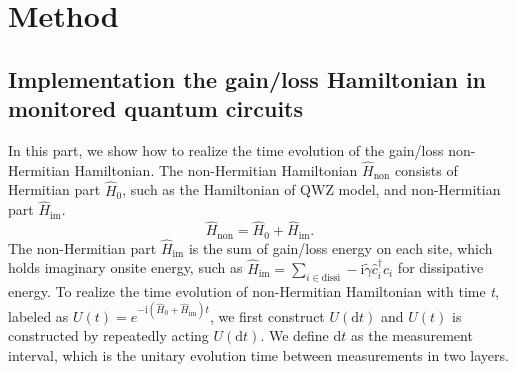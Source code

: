 \documentclass[longbibliography, aps, prx, amsmath, amssymb, amsfonts, twocolumn,superscriptaddress, footinbib]{revtex4-1}
\begin{document}


	\section{Method~\label{sec:method}}
	\subsection{Implementation the gain/loss Hamiltonian in monitored quantum circuits}

	In this part, we show how to realize the time evolution of the gain/loss non-Hermitian Hamiltonian. The non-Hermitian Hamiltonian $\hat{H}_{\text{non}}$ consists of Hermitian part $\hat{H}_0$, such as the Hamiltonian of QWZ model, and non-Hermitian part $\hat{H}_{\text{im}}$.
	\begin{equation}
		\hat{H}_{\text{non}} = \hat{H}_0 +\hat{H}_{\text{im}}. \label{eq:non-hermitian}
	\end{equation}
	The non-Hermitian part $\hat{H}_{\text{im}}$ is the sum of gain/loss energy on each site, which holds imaginary onsite energy, such as $\hat{H}_{\text{im}} = \sum_{i\in \text{dissi}} -\mathrm{i}\tilde{\gamma} \hat{c}_i^{\dagger} \hat{c}_i$ for dissipative energy. 
	To realize the time evolution of non-Hermitian Hamiltonian with time \textit{t}, labeled as $U(t) = e^{-\mathrm{i}(\hat{H}_0+\hat{H}_{\text{im}})t}$, we first construct $U(\mathrm{d} t)$ and  
	$U(t)$ is constructed by repeatedly acting $U(\mathrm{d} t)$.
	We define $\mathrm{d} t$ as the measurement interval, which is the unitary evolution time between measurements in two layers.
	
\end{document}
